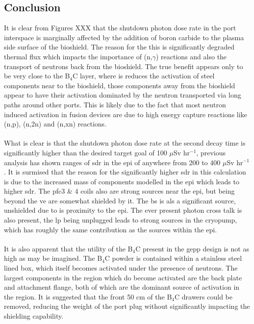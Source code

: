\documentclass[12pt]{article}
\begin{document}
\subsection{Conclusion}
It is clear from Figures XXX that the shutdown photon dose rate in the port
interspace is marginally affected by the addition of boron carbide to the
plasma side surface of the bioshield. The reason for the this is significantly
degraded thermal flux which impacts the importance of (n,$\gamma$) reactions
and also the transport of neutrons back from the bioshield. The true benefit
appears only to be very close to the B$_4$C layer, where is reduces the
activation of steel components near to the bioshield, those components away
from the bioshield appear to have their activation dominated by the neutron
transported via long paths around other ports. This is  likely due to the fact
that most neutron induced activation in fusion devices are due to high energy
capture reactions like (n,p), (n,2n) and (n,xn) reactions.
\\
\\
What is clear is that the shutdown photon dose rate at the second decay time is
significantly higher than the desired target goal of 100 $\mu$Sv hr$^{-1}$,
previous analysis has shown ranges of \gls{sdr} in the \gls{epi} of anywhere
from 200 to 400 $\mu$Sv hr$^{-1}$. It is surmised that the reason for the
significantly higher \gls{sdr} in this calculation is due to the increased
mass of components modelled in the \gls{epi} which leads to higher \gls{sdr}.
The \gls{pfc}3 \& 4 coils also are strong sources near the \gls{epi}, but being
beyond the \gls{ve} are somewhat shielded by it. The \gls{bs} is als a
significant source, unshielded due to is proximity to the \gls{epi}. The ever
present photon cross talk is also present, the \gls{lp} being unplugged leads
to strong sources in the cryopump, which has roughly the same contribution
as the sources within the \gls{epi}.
\\
\\
It is also apparent that the utility of the B$_4$C present in the \gls{gepp}
design is not as high as may be imagined. The B$_4$C powder is contained within
a stainless steel lined box, which itself becomes activated under the presence
of neutrons. The largest components in the region which do become activated are
the back plate and attachment flange, both of which are the dominant source of
activation in the region. It is suggested that the front 50 cm of the B$_4$C
drawers could be removed, reducing the weight of the port plug without
significantly impacting the shielding capability.
\newpage
\clearpage
\end{document}

